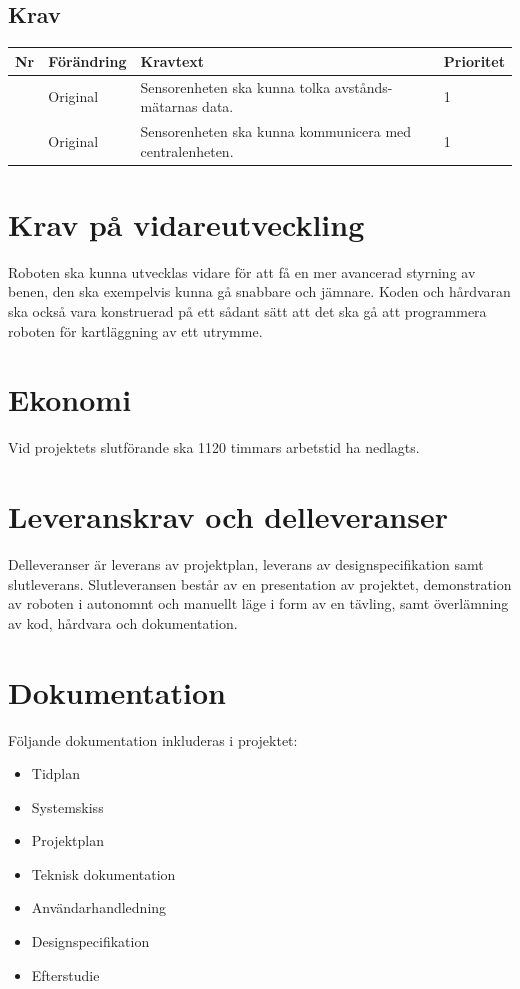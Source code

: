 \documentclass[a4paper,titlepage,12pt]{article}
\newcounter{reqNr}
\newcommand{\nextReqNr}{\stepcounter{reqNr}\arabic{reqNr}}
\begin{document}
	\subsection{Krav}
	\begin{table}[h]
		\label{tab:label}
		\begin{tabularx}{\textwidth}{|c|l|X|l|}
			\hline
			\textbf{Nr} & \textbf{Förändring} & \textbf{Kravtext} & \textbf{Prioritet} 
				\\ \hline

			\nextReqNr & Original & Sensorenheten ska kunna tolka avstånds- mätarnas data. & 1
				\\ \hline

			\nextReqNr & Original & Sensorenheten ska kunna kommunicera med 
				centralenheten. & 1
				\\ \hline

		\end{tabularx}
	\end{table}


	\section{Krav på vidareutveckling}
	Roboten ska kunna utvecklas vidare för att få en mer avancerad styrning av benen, 
	den ska exempelvis kunna gå snabbare och jämnare. Koden och hårdvaran ska också vara
	konstruerad på ett sådant sätt att det ska gå att programmera roboten för
	kartläggning av ett utrymme.

	\section{Ekonomi}
	Vid projektets slutförande ska 1120 timmars arbetstid ha nedlagts.

	\section{Leveranskrav och delleveranser}
	Delleveranser är leverans av projektplan, leverans av designspecifikation 
	samt slutleverans. Slutleveransen består av en presentation av projektet, 
	demonstration av roboten i autonomnt och manuellt läge i form av en tävling,
	samt överlämning av kod, hårdvara och dokumentation.
	
	\section{Dokumentation}
    Följande dokumentation inkluderas i projektet:
    \begin{itemize}
		\item Tidplan 
		\item Systemskiss 
		\item Projektplan
		\item Teknisk dokumentation 
		\item Användarhandledning 
        \item Designspecifikation
        \item Efterstudie
    \end{itemize}
\end{document}
